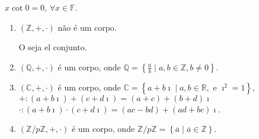 \begin{proposition}
	$x\cot0=0$, $\forall x\in\mathbb{F}$.
\end{proposition}

\begin{example}
	\begin{enumerate}
		\item

		      $\left(\mathbb{Z},+,\cdot\right)$ não é um corpo.

		      O seja el conjunto.

		\item

		      $\left(\mathbb{Q},+,\cdot\right)$ é um corpo, onde
		      $\mathbb{Q}=\left\{\frac{a}{b}\mid a,b\in\mathbb{Z},b\neq0\right\}$.

		\item

		      $\left(\mathbb{C},+,\cdot\right)$ é um corpo, onde
		      $\mathbb{C}=\left\{a+b\imath\mid a,b\in\mathbb{R},\text{ e }\imath^{2}=1\right\}$,
		      $+\colon\left(a+b\imath\right)+\left(c+d\imath\right)=\left(a+c\right)+\left(b+d\right)\imath$
		      $\cdot\colon\left(a+b\imath\right)\cdot\left(c+d\imath\right)=\left(ac-bd\right)+\left(ad+bc\right)\imath$.

		\item

		      $\left(\mathbb{Z}/p\mathbb{Z},+,\cdot\right)$ é um corpo, onde $\mathbb{Z}/p\mathbb{Z}=\left\{\overline{a}\mid \overline{a}\in\mathbb{Z}\right\}$.
	\end{enumerate}
\end{example}

